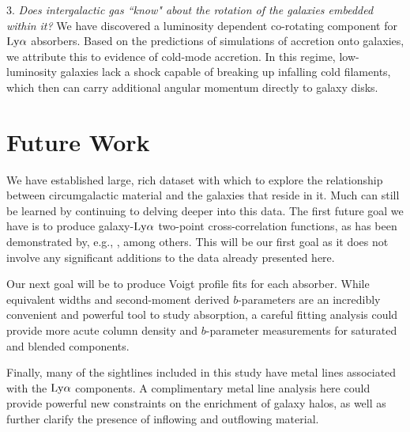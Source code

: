 \documentclass[twocolumn,tighten]{aastex62}
\begin{document}
\vspace{10pt}

3. \emph{Does intergalactic gas ``know" about the rotation of the galaxies embedded within it?}
We have discovered a luminosity dependent co-rotating component for $\rm Ly\alpha$ absorbers. Based on the predictions of simulations of accretion onto galaxies, we attribute this to evidence of cold-mode accretion. In this regime, low-luminosity galaxies lack a shock capable of breaking up infalling cold filaments, which then can carry additional angular momentum directly to galaxy disks.


\section{Future Work}

We have established large, rich dataset with which to explore the relationship between circumgalactic material and the galaxies that reside in it. Much can still be learned by continuing to delving deeper into this data. The first future goal we have is to produce galaxy-$\rm Ly\alpha$ two-point cross-correlation functions, as has been demonstrated by, e.g., \cite{chen2005}, among others. This will be our first goal as it does not involve any significant additions to the data already presented here.

Our next goal will be to produce Voigt profile fits for each absorber. While equivalent widths and second-moment derived $b$-parameters are an incredibly convenient and powerful tool to study absorption, a careful fitting analysis could provide more acute column density and $b$-parameter measurements for saturated and blended components.

Finally, many of the sightlines included in this study have metal lines associated with the $\rm Ly\alpha$ components. A complimentary metal line analysis here could provide powerful new constraints on the enrichment of galaxy halos, as well as further clarify the presence of inflowing and outflowing material. 




{}

\end{document}
